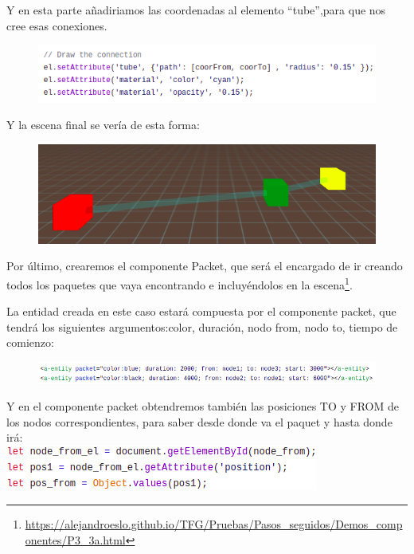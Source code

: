 \documentclass[a4paper, 12pt]{book}
\begin{document}
Y en esta parte añadiriamos las coordenadas al elemento “tube”,para que nos cree esas conexiones.
\begin{figure}[h]
\centering
    \includegraphics[scale=0.7]{img/puesta_datos.png}
\end{figure}

Y la escena final se vería de esta forma:

\begin{figure}[h]
\centering
    \includegraphics[scale=0.7]{img/componenteCONNECTION.png}
\end{figure}

Por último, crearemos el componente Packet, que será el encargado de ir creando todos los paquetes que vaya encontrando e incluyéndolos en la escena\footnote{\url{https://alejandroeslo.github.io/TFG/Pruebas/Pasos_seguidos/Demos_componentes/P3_3a.html}}.

La entidad creada en este caso estará compuesta por el componente packet, que tendrá los siguientes argumentos:color, duración, nodo from, nodo to, tiempo de comienzo:


\begin{figure}[h]
\centering
    \includegraphics[scale=0.7]{img/entidad_packet.png}
\end{figure}

Y en el componente packet obtendremos también las posiciones TO y FROM de los nodos correspondientes, para saber desde donde va el paquet y hasta donde irá:\\

    \includegraphics[scale=0.7]{img/pos_packet1.png}
\end{document}
